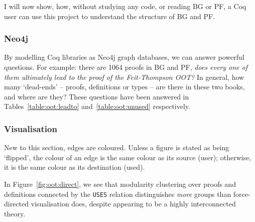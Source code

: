 I will now show, how, without studying any code, or reading BG or PF, a Coq user
can use this project to understand the structure of BG and PF.

\subsubsection{Neo4j}

By modelling Coq libraries as Neo4j graph databases, we can answer powerful
questions. For example: there are 1064 proofs in BG and PF, \emph{does every
one of them ultimately lead to the proof of the Feit-Thompson OOT?} In
general, how many `dead-ends' -- proofs, definitions or types -- are there
in these two books, and where are they? These questions have been answered in
Tables~\ref{table:oot:leadto} and~\ref{table:oot:unused} respectively.

\begin{table}[tp]
  
\end{table}

\begin{table}[tp]
  
\end{table}

\subsubsection{Visualisation}\label{subsubsec:oot:visual}

New to this section, edges are coloured. Unless a figure is stated as being
`flipped', the colour of an edge is the same colour as its source (user);
otherwise, it is the same colour as its destination (used).

In Figure~\ref{fig:oot:direct}, we see that modularity clustering over proofs
and definitions connected by the \texttt{USES} relation distinguishes
\emph{more} groups than force-directed visualisation does, despite appearing to
be a highly interconnected theory.

